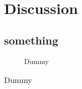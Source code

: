 \chapter{Discussion}

\section{something}


\begin{figure}[ht]
\caption{Dummy}
\label{fig:dum1}
\end{figure}

\begin{table}[ht]
\caption{Dummy}
\begin{tabular}{|c|c|}
\end{tabular}
\label{tab:dum1}
\end{table}
